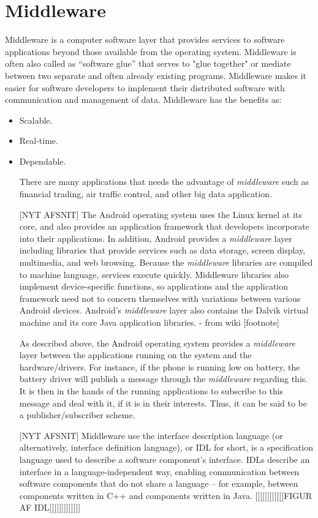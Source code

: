 \section{Middleware}
Middleware is a computer software layer that provides services to software applications beyond those available from the operating system. Middleware is often also called as “software glue” that serves to "glue together" or mediate between two separate and often already existing programs. Middleware makes it easier for software developers to implement their distributed software with communication and management of data.
Middleware has the benefits as:

\begin{itemize}
\item Scalable.
\item Real-time.
\item Dependable.
\begin{itemize}

There are many applications that needs the advantage of \emph{middleware} such as financial trading, air traffic control, and other big data application.

[NYT AFSNIT]
The Android operating system uses the Linux kernel at its core, and also provides an application framework that developers incorporate into their applications. In addition, Android provides a \emph{middleware} layer including libraries that provide services such as data storage, screen display, multimedia, and web browsing. Because the \emph{middleware} libraries are compiled to machine language, services execute quickly. Middleware libraries also implement device-specific functions, so applications and the application framework need not to concern themselves with variations between various Android devices. Android’s \emph{middleware} layer also contains the Dalvik virtual machine and its core Java application libraries. - from wiki [footnote]

As described above, the Android operating system provides a \emph{middleware} layer between the applications running on the system and the hardware/drivers. For instance, if the phone is running low on battery, the battery driver will publish a message through the \emph{middleware} regarding this. It is then in the hands of the running applications to subscribe to this message and deal with it, if it is in their interests. Thus, it can be said to be a publisher/subscriber scheme.

[NYT AFSNIT]
Middleware use the interface description language (or alternatively, interface definition language), or IDL for short, is a specification language used to describe a software component's interface. IDLs describe an interface in a language-independent way, enabling communication between software components that do not share a language – for example, between components written in C++ and components written in Java.
[[[[[[[[[[[[FIGUR AF IDL]]]]]]]]]]]]]


\end{itemize}
\end{itemize}
